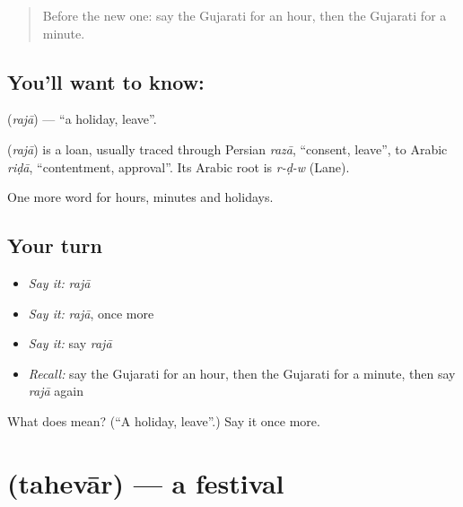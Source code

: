 \label{lesson:GU-C80-holiday}



\begin{quote}
Before the new one: say the Gujarati for an hour, then the Gujarati for a minute.
\end{quote}

\subsection*{You'll want to know: }
\textbf{} (\emph{rajā}) — \textquotedblleft{}a holiday, leave\textquotedblright{}.

\begin{cousinweb}
\textbf{} (\emph{rajā}) is a loan, usually traced through Persian \emph{razā}, \textquotedblleft{}consent, leave\textquotedblright{}, to Arabic \emph{riḍā}, \textquotedblleft{}contentment, approval\textquotedblright{}. Its Arabic root is \emph{r-ḍ-w} (Lane).
\end{cousinweb}

\begin{grammarlens}[title={What you've built}]
One more word for hours, minutes and holidays.
\end{grammarlens}

\subsection*{Your turn}
\begin{itemize}
\raggedright
  \item \emph{Say it:} \emph{rajā}
  \item \emph{Say it:} \emph{rajā}, once more
  \item \emph{Say it:} say \emph{rajā}
  \item \emph{Recall:} say the Gujarati for an hour, then the Gujarati for a minute, then say \emph{rajā} again
\end{itemize}

\begin{tcolorbox}[breakable,colback=teal!4,colframe=teal!35!black,title={Before you move on}]
What does  mean? (\textquotedblleft{}A holiday, leave\textquotedblright{}.) Say it once more.
\end{tcolorbox}
\section[\texorpdfstring{\gu{તહેવાર} (tahevār)}{તહેવાર (tahevār)}]{ (tahevār) — a festival}

